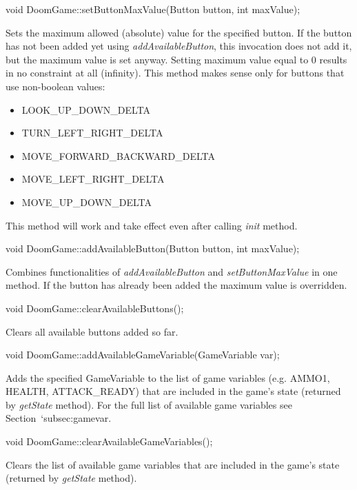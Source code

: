 \vspace{20pt}
\begin{clinee}
void DoomGame::setButtonMaxValue(Button button, int maxValue);
\end{clinee}
	Sets the maximum allowed (absolute) value for the specified button. If the button has not been added yet using \emph{addAvailableButton}, this invocation does not add it, but the maximum value is set anyway. Setting maximum value equal to 0 results in no constraint at all (infinity). This method makes sense only for buttons that use non-boolean values:  
	\begin{itemize}
		\item LOOK\_UP\_DOWN\_DELTA
		\item TURN\_LEFT\_RIGHT\_DELTA
		\item MOVE\_FORWARD\_BACKWARD\_DELTA
		\item MOVE\_LEFT\_RIGHT\_DELTA
		\item MOVE\_UP\_DOWN\_DELTA
 	\end{itemize}
This method will work and take effect even after calling \emph{init} method.


\vspace{20pt}
\begin{clinee}
void DoomGame::addAvailableButton(Button button, int maxValue);
\end{clinee}
	Combines functionalities of \emph{addAvailableButton} and \emph{setButtonMaxValue} in one method. If the button has already been added the maximum value is overridden. 


\vspace{20pt}
\begin{clinee}
void DoomGame::clearAvailableButtons();
\end{clinee}
	Clears all available buttons added so far.


\vspace{20pt}
\begin{clinee}
void DoomGame::addAvailableGameVariable(GameVariable var);
\end{clinee}
	Adds the specified GameVariable to the list of game variables (e.g. AMMO1, HEALTH, ATTACK\_READY) that are included in the game's state (returned by \emph{getState} method). For the full list of available game variables see Section~`{subsec:gamevar}.


\vspace{20pt}
\begin{clinee}
void DoomGame::clearAvailableGameVariables();
\end{clinee}
	Clears the list of available game variables that are included in the game's state (returned by \emph{getState} method).


